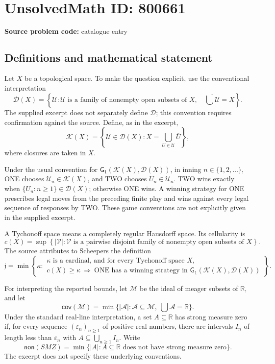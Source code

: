 \documentclass[11pt]{article}
\newcommand{\R}{\mathbb{R}}
\begin{document}
\section*{UnsolvedMath ID: 800661}
\textbf{Source problem code:} catalogue entry
\subsection{Definitions and mathematical statement}
Let \(X\) be a topological space. To make the question explicit, use the conventional interpretation
\[
\mathcal D(X)=\left\{\mathcal U:\mathcal U\text{ is a family of nonempty open subsets of }X,\quad \overline{\bigcup\mathcal U}=X\right\}.
\]
The supplied excerpt does not separately define \(\mathcal D\); this convention requires confirmation against the source. Define, as in the excerpt,
\[
\mathcal K(X)=\left\{\mathcal U\in\mathcal D(X):X=\bigcup_{U\in\mathcal U}\overline U\right\},
\]
where closures are taken in \(X\).

Under the usual convention for \(\mathsf G_1(\mathcal K(X),\mathcal D(X))\), in inning \(n\in\{1,2,\ldots\}\), ONE chooses \(\mathcal U_n\in\mathcal K(X)\), and TWO chooses \(U_n\in\mathcal U_n\). TWO wins exactly when \(\{U_n:n\geq1\}\in\mathcal D(X)\); otherwise ONE wins. A winning strategy for ONE prescribes legal moves from the preceding finite play and wins against every legal sequence of responses by TWO. These game conventions are not explicitly given in the supplied excerpt.

A Tychonoff space means a completely regular Hausdorff space. Its cellularity is
\[
c(X)=\sup\left\{|\mathcal V|:\mathcal V\text{ is a pairwise disjoint family of nonempty open subsets of }X\right\}.
\]
The source attributes to Scheepers the definition
\[
\mathfrak j=\min\left\{\kappa:\begin{gathered}
\kappa\text{ is a cardinal, and for every Tychonoff space }X,\\
c(X)\geq\kappa\ \Longrightarrow\ \text{ONE has a winning strategy in }
\mathsf G_1(\mathcal K(X),\mathcal D(X))
\end{gathered}\right\}.
\]

For interpreting the reported bounds, let \(\mathcal M\) be the ideal of meager subsets of \(\R\), and let
\[
\mathsf{cov}(\mathcal M)=\min\{|\mathcal A|:\mathcal A\subseteq\mathcal M,\ \bigcup\mathcal A=\R\}.
\]
Under the standard real-line interpretation, a set \(A\subseteq\R\) has strong measure zero if, for every sequence \((\varepsilon_n)_{n\geq1}\) of positive real numbers, there are intervals \(I_n\) of length less than \(\varepsilon_n\) with \(A\subseteq\bigcup_{n\geq1}I_n\). Write
\[
\mathsf{non}(SMZ)=\min\{|A|:A\subseteq\R\text{ does not have strong measure zero}\}.
\]
The excerpt does not specify these underlying conventions.
\end{document}
